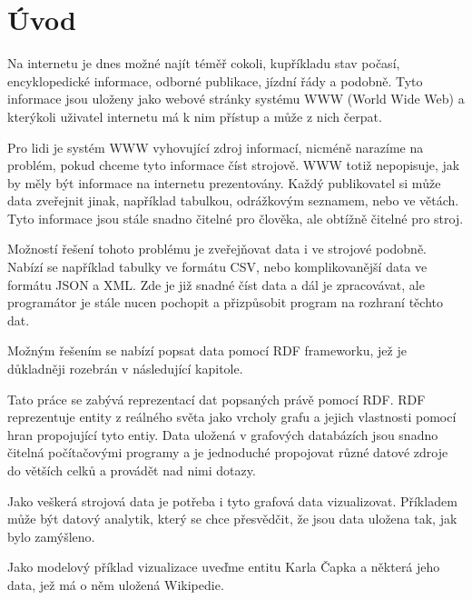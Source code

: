 \chapter*{Úvod}

Na internetu je dnes možné najít téměř cokoli, kupříkladu stav počasí, encyklopedické informace, odborné publikace, jízdní řády a podobně. Tyto informace jsou uloženy jako webové stránky systému WWW (World Wide Web) a kterýkoli uživatel internetu má k nim přístup a může z nich čerpat.

Pro lidi je systém WWW vyhovující zdroj informací, nicméně narazíme na problém, pokud chceme tyto informace číst strojově. WWW totiž nepopisuje, jak by měly být informace na internetu prezentovány. Každý publikovatel si může data zveřejnit jinak, například tabulkou, odrážkovým seznamem, nebo ve větách. Tyto informace jsou stále snadno čitelné pro člověka, ale obtížně čitelné pro stroj.

Možností řešení tohoto problému je zveřejňovat data i ve strojové podobně. Nabízí se například tabulky ve formátu CSV, nebo komplikovanější data ve formátu JSON a XML. Zde je již snadné číst data a dál je zpracovávat, ale programátor je stále nucen pochopit a přizpůsobit program na rozhraní těchto dat.

Možným řešením se nabízí popsat data pomocí RDF frameworku, jež je důkladněji rozebrán v následující kapitole.

\bigskip

Tato práce se zabývá reprezentací dat popsaných právě pomocí RDF. RDF reprezentuje entity z reálného světa jako vrcholy grafu a jejich vlastnosti pomocí hran propojující tyto entiy. Data uložená v grafových databázích jsou snadno čitelná počítačovými programy a je jednoduché propojovat různé datové zdroje do větších celků a provádět nad nimi dotazy.

Jako veškerá strojová data je potřeba i tyto grafová data vizualizovat. Příkladem může být datový analytik, který se chce přesvědčit, že jsou data uložena tak, jak bylo zamýšleno.

Jako modelový příklad vizualizace uveďme entitu Karla Čapka a některá jeho data, jež má o něm uložená Wikipedie.

